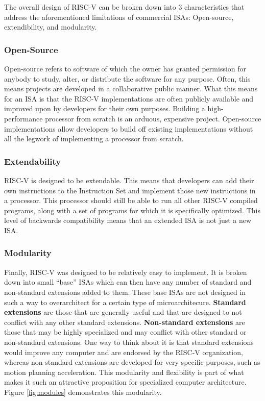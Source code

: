 
    The overall design of RISC-V can be broken down into 3 characteristics that address the aforementioned limitations of commercial \glspl{ISA}: Open-source, extendibility, and modularity.

    \subsubsection{Open-Source}
        Open-source refers to software of which the owner has granted permission for anybody to study, alter, or distribute the software for any purpose. Often, this means projects are developed in a collaborative public manner. What this means for an ISA is that the RISC-V implementations are often publicly available and improved upon by developers for their own purposes. Building a high-performance processor from scratch is an arduous, expensive project. Open-source implementations allow developers to build off existing implementations without all the legwork of implementing a processor from scratch.

    \subsubsection{Extendability}
        RISC-V is designed to be extendable. This means that developers can add their own instructions to the Instruction Set and implement those new instructions in a processor. This processor should still be able to run all other RISC-V compiled programs, along with a set of programs for which it is specifically optimized. This level of backwards compatibility means that an extended ISA is not just a new ISA. 

    \subsubsection{Modularity}
        Finally, RISC-V was designed to be relatively easy to implement. It is broken down into small ``base'' \glspl{ISA} which can then have any number of standard and non-standard extensions added to them. These base ISAs are not designed in such a way to overarchitect for a certain type of microarchitecure. \textbf{Standard extensions} are those that are generally useful and that are designed to not conflict with any other standard extensions. \textbf{Non-standard extensions} are those that may be highly specialized and may conflict with other standard or non-standard extensions. One way to think about it is that standard extensions would improve any computer and are endorsed by the RISC-V organization, whereas non-standard extensions are developed for very specific purposes, such as motion planning acceleration. This modularity and flexibility is part of what makes it such an attractive proposition for specialized computer architecture. Figure \ref{fig:modules} demonstrates this modularity.

